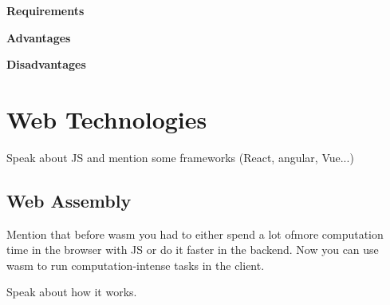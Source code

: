 \textbf{Requirements}

\textbf{Advantages}

\textbf{Disadvantages}

\section{Web Technologies}
Speak about JS and mention some frameworks (React, angular, Vue...)

\subsection{Web Assembly}
Mention that before wasm you had to either spend a lot ofmore computation time in the browser with JS or do it faster in the backend. Now you can use wasm to run computation-intense tasks in the client.

Speak about how it works.